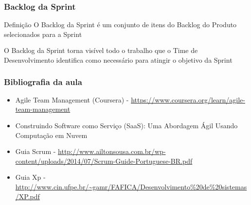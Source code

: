 \begin{frame}
 \frametitle{Backlog da Sprint}
\begin{block}{Definição}
O Backlog da Sprint é um conjunto de itens do Backlog do Produto selecionados para a Sprint
 \end{block}
 \begin{block}{}
O Backlog da Sprint torna visível todo o trabalho que o Time de Desenvolvimento identifica
como necessário para atingir o objetivo da Sprint
 \end{block}
\end{frame}

\begin{frame}
 \frametitle{Bibliografia da aula}
 \begin{itemize}
 \item Agile Team Management (Coursera) - \url{https://www.coursera.org/learn/agile-team-management}
 \item Construindo Software como Serviço (SaaS): Uma Abordagem Ágil Usando Computação em Nuvem  
 \item Guia Scrum - \url{http://www.ailtonsousa.com.br/wp-content/uploads/2014/07/Scrum-Guide-Portuguese-BR.pdf}
 \item Guia Xp - \url{http://www.cin.ufpe.br/~gamr/FAFICA/Desenvolvimento\%20de\%20sistemas/XP.pdf}
 \end{itemize}
\end{frame}

